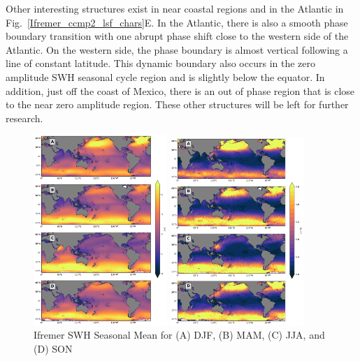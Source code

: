 \documentclass[12pt,twoside]{article}
\begin{document}
Other interesting structures exist in near coastal regions and in the Atlantic in Fig.~\ref{Ifremer_ccmp2_lsf_chars}E. In the Atlantic, there is also a smooth phase boundary transition with one abrupt phase shift close to the western side of the Atlantic. On the western side, the phase boundary is almost vertical following a line of constant latitude. This dynamic boundary also occurs in the zero amplitude SWH seasonal cycle region and is slightly below the equator. In addition, just off the coast of Mexico, there is an out of phase region that is close to the near zero amplitude region. These other structures will be left for further research.

\begin{figure}[tbh]
\centering
  \begin{minipage}{.5\textwidth}
    \centering
    \includegraphics[width=0.45\textwidth]{figs/statistical_moments/Ifremer_p1_seasonal_mean.png}
    \caption{Ifremer SWH Seasonal Mean for (A) DJF, (B) MAM, (C) JJA, and (D) SON}
    \label{Ifremer_swh_seasonal_mean}
  \end{minipage}%
  \begin{minipage}{.5\textwidth}
    \centering
    \includegraphics[width=0.45\textwidth]{figs/statistical_moments/Ifremer_p1_seasonal_var.png}

\end{minipage}
\end{figure}
\end{document}
